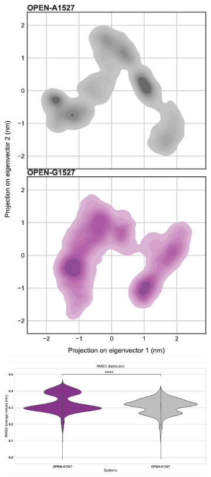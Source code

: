 \documentclass[12pt]{article}
\begin{document}
\begin{figure}[H]
\begin{subfigure}[t]{.25\textwidth}
        \includegraphics[width=\textwidth]{./extended_plots/rmsd_projection_open.png}        
    \end{subfigure}
    \hspace{1cm}
    \begin{subfigure}[t]{.5\textwidth}
        \caption{}
        \includegraphics[width=\textwidth]{./extended_plots/rmsd_volcano.png}        

\end{subfigure}
\end{figure}
\end{document}
